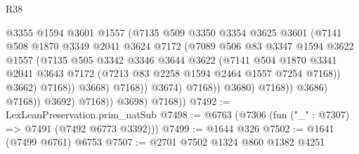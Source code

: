 \begin{lexlean}{R38}
\begin{coremodule}
                                      @3355
                                      @1594
                                      @3601
                                      @1557
                                      (@7135
                                        @509
                                        @3350
                                        @3354
                                        @3625
                                        @3601
                                        (@7141
                                          @508
                                          @1870
                                          @3349
                                          @2041
                                          @3624
                                          @7172
                                          (@7089
                                            @506
                                            @83
                                            @3347
                                            @1594
                                            @3622
                                            @1557
                                            (@7135
                                              @505
                                              @3342
                                              @3346
                                              @3644
                                              @3622
                                              (@7141
                                                @504
                                                @1870
                                                @3341
                                                @2041
                                                @3643
                                                @7172
                                                (@7213 @83 @2258 @1594 @2464 @1557 @7254 @7168))
                                              @3662)
                                            @7168))
                                        @3668)
                                      @7168))
                                  @3674)
                                @7168))
                            @3680)
                          @7168))
                      @3686)
                    @7168))
                @3692)
              @7168))
          @3698)
        @7168))
@7492 := LexLeanPreservation.prim_natSub
@7498 := @6763 (@7306 (fun ("_" : @7307) => @7491 (@7492 @6773 @3392)))
@7499 := @1644 @326
@7502 := @1641 (@7499 @6761) @6753
@7507 := @2701 @7502 @1324 @860 @1382 @4251

\end{coremodule}
\end{lexlean}
